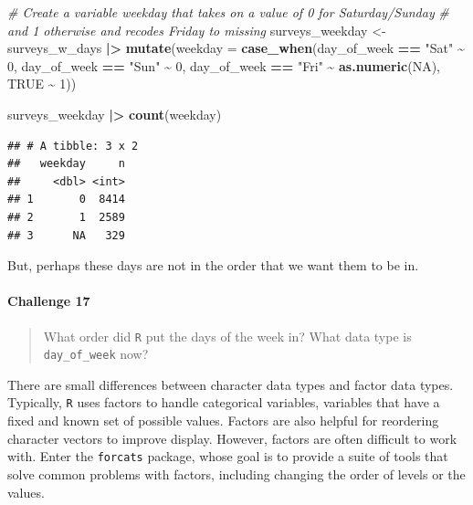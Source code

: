 \documentclass[
  10pt,
  letterpaper,
  twoside,
  openright]{book}
\newenvironment{Shaded}{\begin{snugshade}}{\end{snugshade}}
\newcommand{\AttributeTok}[1]{\textcolor[rgb]{0.13,0.29,0.53}{#1}}
\newcommand{\CommentTok}[1]{\textcolor[rgb]{0.56,0.35,0.01}{\textit{#1}}}
\newcommand{\ConstantTok}[1]{\textcolor[rgb]{0.56,0.35,0.01}{#1}}
\newcommand{\DecValTok}[1]{\textcolor[rgb]{0.00,0.00,0.81}{#1}}
\newcommand{\FunctionTok}[1]{\textcolor[rgb]{0.13,0.29,0.53}{\textbf{#1}}}
\newcommand{\NormalTok}[1]{#1}
\newcommand{\OtherTok}[1]{\textcolor[rgb]{0.56,0.35,0.01}{#1}}
\newcommand{\SpecialCharTok}[1]{\textcolor[rgb]{0.81,0.36,0.00}{\textbf{#1}}}
\newcommand{\StringTok}[1]{\textcolor[rgb]{0.31,0.60,0.02}{#1}}
\begin{document}
\begin{Shaded}
\begin{Highlighting}[]
\CommentTok{\# Create a variable weekday that takes on a value of 0 for Saturday/Sunday}
\CommentTok{\# and 1 otherwise and recodes Friday to missing}
\NormalTok{surveys\_weekday }\OtherTok{\textless{}{-}}\NormalTok{ surveys\_w\_days }\SpecialCharTok{|\textgreater{}}
  \FunctionTok{mutate}\NormalTok{(}\AttributeTok{weekday =} \FunctionTok{case\_when}\NormalTok{(day\_of\_week }\SpecialCharTok{==} \StringTok{"Sat"} \SpecialCharTok{\textasciitilde{}} \DecValTok{0}\NormalTok{,}
\NormalTok{                             day\_of\_week }\SpecialCharTok{==} \StringTok{"Sun"} \SpecialCharTok{\textasciitilde{}} \DecValTok{0}\NormalTok{,}
\NormalTok{                             day\_of\_week }\SpecialCharTok{==} \StringTok{"Fri"} \SpecialCharTok{\textasciitilde{}} \FunctionTok{as.numeric}\NormalTok{(}\ConstantTok{NA}\NormalTok{),}
                             \ConstantTok{TRUE} \SpecialCharTok{\textasciitilde{}} \DecValTok{1}\NormalTok{))}

\NormalTok{surveys\_weekday }\SpecialCharTok{|\textgreater{}}
  \FunctionTok{count}\NormalTok{(weekday)}
\end{Highlighting}
\end{Shaded}

\begin{verbatim}
## # A tibble: 3 x 2
##   weekday     n
##     <dbl> <int>
## 1       0  8414
## 2       1  2589
## 3      NA   329
\end{verbatim}

But, perhaps these days are not in the order that we want them to be in.

\hypertarget{challenge-17}{%
\paragraph{Challenge 17}\label{challenge-17}}

\begin{quote}
What order did \texttt{R} put the days of the week in? What data type is
\texttt{day\_of\_week} now?
\end{quote}

There are small differences between character data types and factor data
types. Typically, \texttt{R} uses factors to handle categorical
variables, variables that have a fixed and known set of possible values.
Factors are also helpful for reordering character vectors to improve
display. However, factors are often difficult to work with. Enter the
\texttt{forcats} package, whose goal is to provide a suite of tools that
solve common problems with factors, including changing the order of
levels or the values.
\end{document}

